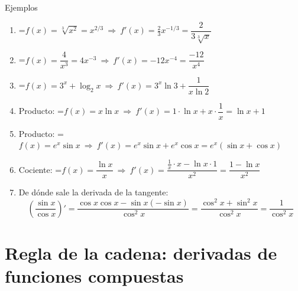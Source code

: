 \documentclass[11pt,a4paper]{article}
\newcommand{\fmm}[1]{\setbox0=\hbox{$#1$}\ifdim\wd0>\linewidth\[#1\]\else\mbox{\box0}\fi}
\begin{document}
  
\begin{fmex}{Ejemplos}
\begin{enumerate}[label=\textbf{\arabic*.},leftmargin=*]
\item \fmm{f(x)=\sqrt[3]{x^2}=x^{2/3}\ \Rightarrow\ f'(x)=\tfrac23x^{-1/3}=\dfrac{2}{3\sqrt[3]{x}}}
\item \fmm{f(x)=\dfrac{4}{x^3}=4x^{-3}\ \Rightarrow\ f'(x)=-12x^{-4}=\dfrac{-12}{x^4}}
\item \fmm{f(x)=3^x+\log_2x\ \Rightarrow\ f'(x)=3^x\ln3+\dfrac{1}{x\ln2}}
\item Producto: \fmm{f(x)=x\ln x\ \Rightarrow\ f'(x)=1\cdot\ln x+x\cdot\dfrac1x=\ln x+1}
\item Producto: \fmm{f(x)=e^x\sin x\ \Rightarrow\ f'(x)=e^x\sin x+e^x\cos x=e^x(\sin x+\cos x)}
\item Cociente: \fmm{f(x)=\dfrac{\ln x}{x}\ \Rightarrow\ f'(x)=\dfrac{\frac1x\cdot x-\ln x\cdot1}{x^2}=\dfrac{1-\ln x}{x^2}}
\item De dónde sale la derivada de la tangente: 
\[\left(\dfrac{\sin x}{\cos x}\right)'=\dfrac{\cos x\cos x-\sin x(-\sin x)}{\cos^2x}=\dfrac{\cos^2x+\sin^2x}{\cos^2x}=\dfrac{1}{\cos^2x}\]

\end{enumerate}
\end{fmex}

  
\section{Regla de la cadena: derivadas de funciones compuestas}\hypertarget{sec6}{}

  
\end{document}

